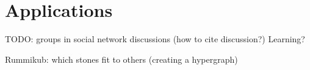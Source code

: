 \chapter{Applications}\label{chapter:applications}

TODO: groups in social network discussions (how to cite discussion?)
Learning?

Rummikub: which stones fit to others (creating a hypergraph)